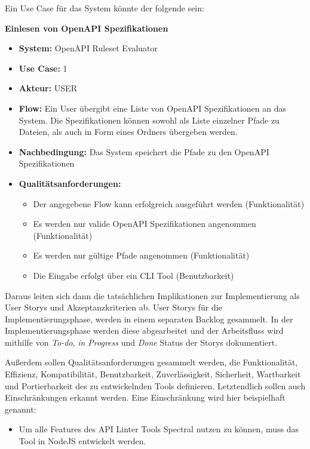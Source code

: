 Ein Use Case für das System könnte der folgende sein:

\textbf{Einlesen von OpenAPI Spezifikationen}

\begin{itemize}
    \item \textbf{System:} OpenAPI Ruleset Evaluator
    \item \textbf{Use Case:} 1
    \item \textbf{Akteur:} USER
    \item \textbf{Flow:} Ein User übergibt eine Liste von OpenAPI Spezifikationen an das System. Die Spezifikationen können sowohl als Liste einzelner Pfade zu Dateien, als auch in Form eines Ordners übergeben werden.
    \item \textbf{Nachbedingung:} Das System speichert die Pfade zu den OpenAPI Spezifikationen
    \item \textbf{Qualitätsanforderungen:}
    \begin{itemize}
        \item Der angegebene Flow kann erfolgreich ausgeführt werden (Funktionalität)
        \item Es werden nur valide OpenAPI Spezifikationen angenommen (Funktionalität)
        \item Es werden nur gültige Pfade angenommen (Funktionalität)
        \item Die Eingabe erfolgt über ein CLI Tool (Benutzbarkeit)
    \end{itemize}
\end{itemize}

Daraus leiten sich dann die tatsächlichen Implikationen zur Implementierung als User Storys und Akzeptanzkriterien ab. User Storys für die Implementierungsphase, werden in einem separaten Backlog gesammelt. In der Implementierungsphase werden diese abgearbeitet und der Arbeitsfluss wird mithilfe von \textit{To-do}, \textit{in Progress} und \textit{Done} Status der Storys dokumentiert.

Außerdem sollen Qualitätsanforderungen gesammelt werden, die Funktionalität, Effizienz, Kompatibilität, Benutzbarkeit, Zuverlässigkeit, Sicherheit, Wartbarkeit und Portierbarkeit des zu entwickelnden Tools definieren. Letztendlich sollen auch Einschränkungen erkannt werden. Eine Einschränkung wird hier beispielhaft genannt:

\begin{itemize}
    \item Um alle Features des API Linter Tools Spectral nutzen zu können, muss das Tool in NodeJS entwickelt werden.
\end{itemize}


